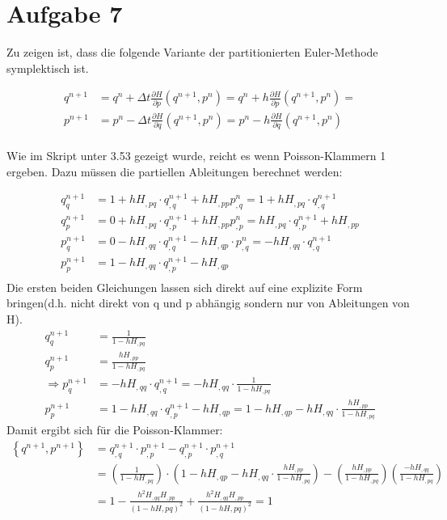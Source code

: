 \documentclass[a4paper,10pt]{article}
\newcommand{\prt}[2]{\frac{\partial #1}{\partial #2}}
\begin{document}
\section{Aufgabe 7}

Zu zeigen ist, dass die folgende Variante der partitionierten Euler-Methode symplektisch ist.

\begin{align*}
 q^{n+1} &= q^n + \Delta t \prt H p \left(q^{n + 1}, p^n \right) = q^n + h \prt H p \left(q^{n + 1}, p^n \right) =  \\
 p^{n+1} &= p^n - \Delta t \prt H q \left(q^{n + 1}, p^n \right) = p^n - h \prt H q \left(q^{n + 1}, p^n \right)\\
\end{align*}

Wie im Skript unter 3.53 gezeigt wurde, reicht es wenn Poisson-Klammern 1 ergeben.
Dazu müssen die partiellen Ableitungen berechnet werden:

\begin{align*}
q^{n+1}_q &= 1 + h H_{,pq} \cdot q^{n+1}_{,q} + h H_{,pp} p^n_{,q} =  1 + h H_{,pq} \cdot q^{n+1}_{,q} \\
q^{n+1}_p &= 0 + h H_{,pq} \cdot q^{n+1}_{,p} + h H_{,pp} p^n_{,p} = h H_{,pq} \cdot q^{n+1}_{,p} + h H_{,pp} \\
p^{n+1}_q &= 0 - h H_{,qq} \cdot q^{n+1}_{,q} - h H_{,qp}  \cdot p^{n}_{,q} = - h H_{,qq}  \cdot q^{n+1}_{,q} \\
p^{n+1}_p &= 1 - h H_{,qq} \cdot q^{n+1}_{,p} - h H_{,qp} \\
\end{align*}
Die ersten beiden Gleichungen lassen sich direkt auf eine explizite Form bringen(d.h. nicht direkt von q und p abhängig sondern nur von Ableitungen von H).
\begin{align*}
q^{n+1}_q &= \frac{1}{1 - h H_{,pq}} \\
q^{n+1}_p &= \frac{h H_{,pp}}{1 - h H_{,pq}} \\
\Rightarrow
p^{n+1}_q &= - h H_{,qq}  \cdot q^{n+1}_{,q} = - h H_{,qq}  \cdot \frac{1}{1 - h H_{,pq}} \\
p^{n+1}_p &= 1 - h H_{,qq} \cdot q^{n+1}_{,p} - h H_{,qp} = 1 - h H_{,qp} - h H_{,qq} \cdot \frac{h H_{,pp}}{1 - h H_{,pq}}
\end{align*}
Damit ergibt sich für die Poisson-Klammer:
\begin{align*}
\left\{
  q^{n+1}, p^{n+1}
\right\} &= q^{n+1}_{,q} \cdot p^{n+1}_{,p} - q^{n+1}_{,p} \cdot p^{n+1}_{,q} \\
&=
\left(\frac{1}{1 - h H_{,pq}}\right) \cdot
\left(1 - h H_{,qp} - h H_{,qq} \cdot \frac{h H_{,pp}}{1 - h H_{,pq}}\right)
-
\left(\frac{h H_{,pp}}{1 - h H_{,pq}}\right)
\left(\frac{- h H_{,qq}}{1 - h H_{,pq}} \right) \\
&= 1 - \frac{h^2 H_{,qq} H_{,pp}}{(1- h H{,pq})^2}
+ \frac{h^2 H_{,qq} H_{,pp}}{(1- h H{,pq})^2} = 1 \\
\end{align*}
\end{document}
